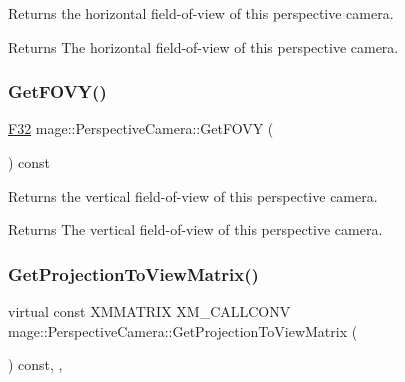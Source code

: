 Returns the horizontal field-\/of-\/view of this perspective camera.

\begin{DoxyReturn}{Returns}
The horizontal field-\/of-\/view of this perspective camera. 
\end{DoxyReturn}
\hypertarget{classmage_1_1_perspective_camera_a753f4479a5a13000864c297bc34c051f}{}\label{classmage_1_1_perspective_camera_a753f4479a5a13000864c297bc34c051f} 
\subsubsection{\texorpdfstring{Get\+F\+O\+V\+Y()}{GetFOVY()}}
{\footnotesize\ttfamily \hyperlink{namespacemage_aa97e833b45f06d60a0a9c4fc22ae02c0}{F32} mage\+::\+Perspective\+Camera\+::\+Get\+F\+O\+VY (\begin{DoxyParamCaption}{ }\end{DoxyParamCaption}) const\hspace{0.3cm}{\ttfamily [noexcept]}}

Returns the vertical field-\/of-\/view of this perspective camera.

\begin{DoxyReturn}{Returns}
The vertical field-\/of-\/view of this perspective camera. 
\end{DoxyReturn}
\hypertarget{classmage_1_1_perspective_camera_ac0353864cc0eafe5ea6af54b2b860992}{}\label{classmage_1_1_perspective_camera_ac0353864cc0eafe5ea6af54b2b860992} 
\subsubsection{\texorpdfstring{Get\+Projection\+To\+View\+Matrix()}{GetProjectionToViewMatrix()}}
{\footnotesize\ttfamily virtual const X\+M\+M\+A\+T\+R\+IX X\+M\+\_\+\+C\+A\+L\+L\+C\+O\+NV mage\+::\+Perspective\+Camera\+::\+Get\+Projection\+To\+View\+Matrix (\begin{DoxyParamCaption}{ }\end{DoxyParamCaption}) const\hspace{0.3cm}{\ttfamily [override]}, {\ttfamily [virtual]}, {\ttfamily [noexcept]}}

